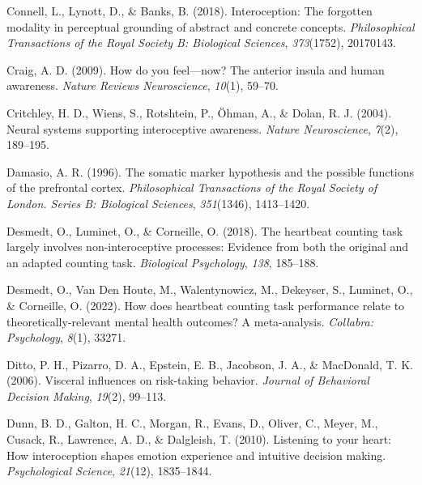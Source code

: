 \documentclass[
  man,mask,floatsintext]{apa6}
\newlength{\cslhangindent}
\newlength{\cslentryspacingunit} %
\newenvironment{CSLReferences}[2] %
 {%
  \setlength{\parindent}{0pt}
  \ifodd #1
  \let\oldpar\par
  \def\par{\hangindent=\cslhangindent\oldpar}
  \fi
  \setlength{\parskip}{#2\cslentryspacingunit}
 }%
 {}
\begin{document}
\begin{CSLReferences}{1}{0}
\leavevmode{}%
Connell, L., Lynott, D., \& Banks, B. (2018). Interoception: The forgotten modality in perceptual grounding of abstract and concrete concepts. \emph{Philosophical Transactions of the Royal Society B: Biological Sciences}, \emph{373}(1752), 20170143.

\leavevmode{}%
Craig, A. D. (2009). How do you feel---now? The anterior insula and human awareness. \emph{Nature Reviews Neuroscience}, \emph{10}(1), 59--70.

\leavevmode{}%
Critchley, H. D., Wiens, S., Rotshtein, P., Öhman, A., \& Dolan, R. J. (2004). Neural systems supporting interoceptive awareness. \emph{Nature Neuroscience}, \emph{7}(2), 189--195.

\leavevmode{}%
Damasio, A. R. (1996). The somatic marker hypothesis and the possible functions of the prefrontal cortex. \emph{Philosophical Transactions of the Royal Society of London. Series B: Biological Sciences}, \emph{351}(1346), 1413--1420.

\leavevmode{}%
Desmedt, O., Luminet, O., \& Corneille, O. (2018). The heartbeat counting task largely involves non-interoceptive processes: Evidence from both the original and an adapted counting task. \emph{Biological Psychology}, \emph{138}, 185--188.

\leavevmode{}%
Desmedt, O., Van Den Houte, M., Walentynowicz, M., Dekeyser, S., Luminet, O., \& Corneille, O. (2022). How does heartbeat counting task performance relate to theoretically-relevant mental health outcomes? A meta-analysis. \emph{Collabra: Psychology}, \emph{8}(1), 33271.

\leavevmode{}%
Ditto, P. H., Pizarro, D. A., Epstein, E. B., Jacobson, J. A., \& MacDonald, T. K. (2006). Visceral influences on risk-taking behavior. \emph{Journal of Behavioral Decision Making}, \emph{19}(2), 99--113.

\leavevmode{}%
Dunn, B. D., Galton, H. C., Morgan, R., Evans, D., Oliver, C., Meyer, M., Cusack, R., Lawrence, A. D., \& Dalgleish, T. (2010). Listening to your heart: How interoception shapes emotion experience and intuitive decision making. \emph{Psychological Science}, \emph{21}(12), 1835--1844.


\end{CSLReferences}
\end{document}
